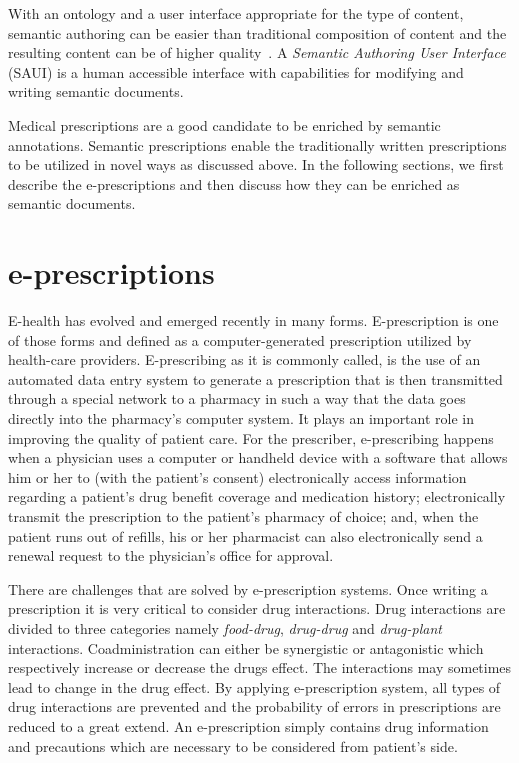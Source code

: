\documentclass[10pt, conference, compsocconf]{IEEEtran}
\begin{document}
With an ontology and a user interface appropriate for the type of content, semantic authoring can be easier than traditional composition of content and the resulting content can be of higher quality~\cite{hasida2007}.
A \emph{Semantic Authoring User Interface} (SAUI) is a human accessible interface with capabilities for modifying and writing semantic documents.

Medical prescriptions are a good candidate to be enriched by semantic annotations.
Semantic prescriptions enable the traditionally written prescriptions to be utilized in novel ways as discussed above.
In the following sections, we first describe the e-prescriptions and then discuss how they can be enriched as semantic documents.

\section{e-prescriptions}
\label{sec:epresc}
E-health has evolved and emerged recently in many forms.
E-prescription is one of those forms and defined as a computer-generated prescription utilized by health-care providers.
E-prescribing as it is commonly called, is the use of an automated data entry system to generate a prescription that is then transmitted through a special network to a pharmacy in such a way that the data goes directly into the pharmacy’s computer system.
It plays an important role in improving the quality of patient care.
For the prescriber, e-prescribing happens when a physician uses a computer or handheld device with a software that allows him or her to (with the patient’s consent) electronically access information regarding a patient’s drug benefit coverage and medication history; electronically transmit the prescription to the patient’s pharmacy of choice; and, when the patient runs out of refills, his or her pharmacist can also electronically send a renewal request to the physician’s office for approval.

There are challenges that are solved by e-prescription systems.
Once writing a prescription it is very critical to consider drug interactions.
Drug interactions are divided to three categories namely \emph{food-drug}, \emph{drug-drug} and \emph{drug-plant} interactions.
Coadministration can either be synergistic or antagonistic which respectively increase or decrease the drugs effect.
The interactions may sometimes lead to change in the drug effect.
By applying e-prescription system, all types of drug interactions are prevented and the probability of errors in prescriptions are reduced to a great extend.
An e-prescription simply contains drug information and precautions which are necessary to be considered from patient's side.
\end{document}
